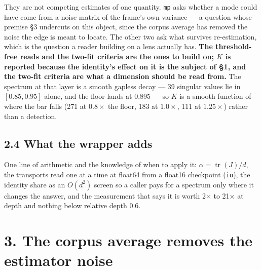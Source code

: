 \documentclass[10pt,letterpaper,twocolumn]{article}
\begin{document}

They are not competing estimates of one quantity. \texttt{mp} asks whether a mode could have come from a
noise matrix of the frame's own variance --- a question whose premise §3 undercuts on this object,
since the corpus average has removed the noise the edge is meant to locate. The other two ask what
survives re-estimation, which is the question a reader building on a lens actually has. \textbf{The
threshold-free reads and the two-fit criteria are the ones to build on; \(K\) is reported because the
identity's effect on it is the subject of §1, and the two-fit criteria are what a dimension should
be read from.}
The spectrum at that layer is a smooth gapless decay --- 39 singular values lie in \([0.85, 0.95]\)
alone, and the floor lands at 0.895 --- so \(K\) is a smooth function of where the bar falls
(271 at \(0.8\times\) the floor, 183 at \(1.0\times\), 111 at \(1.25\times\)) rather than a detection.

\subsection{2.4 What the wrapper adds}\label{24-what-the-wrapper-adds}

One line of arithmetic and the knowledge of when to apply it: \(\alpha=\operatorname{tr}(J)/d\), the
transports read one at a time at float64 from a float16 checkpoint (\texttt{io}), the identity share as an
\(O(d^2)\) screen so a caller pays for a spectrum only where it changes the answer, and the
measurement that says it is worth 2× to 21× at depth and nothing below relative depth 0.6.

\section{3. The corpus average removes the estimator noise}\label{3-the-corpus-average-removes-the-estimator-noise}
\end{document}

